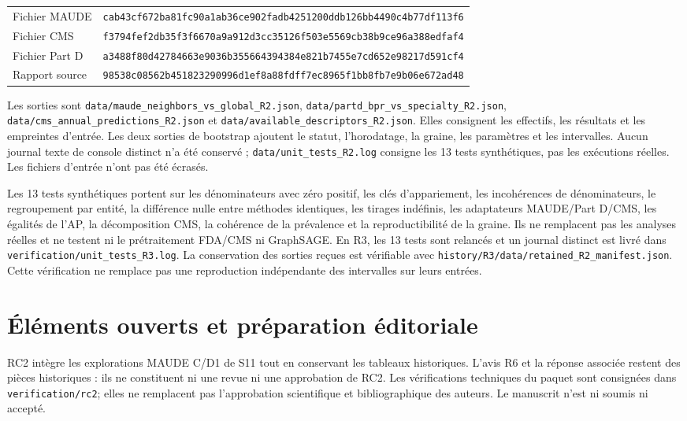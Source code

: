 \documentclass[10pt,a4paper]{article}
\newcommand{\src}[1]{{\small\nolinkurl{#1}}}
\begin{document}
\begin{tabularx}{\linewidth}{@{}lX@{}}
Fichier MAUDE & \src{cab43cf672ba81fc90a1ab36ce902fadb4251200ddb126bb4490c4b77df113f6}\\
Fichier CMS & \src{f3794fef2db35f3f6670a9a912d3cc35126f503e5569cb38b9ce96a388edfaf4}\\
Fichier Part D & \src{a3488f80d42784663e9036b355664394384e821b7455e7cd652e98217d591cf4}\\
Rapport source & \src{98538c08562b451823290996d1ef8a88fdff7ec8965f1bb8fb7e9b06e672ad48}\\
\end{tabularx}

Les sorties sont \src{data/maude_neighbors_vs_global_R2.json}, \src{data/partd_bpr_vs_specialty_R2.json}, \src{data/cms_annual_predictions_R2.json} et \src{data/available_descriptors_R2.json}. Elles consignent les effectifs, les résultats et les empreintes d'entrée. Les deux sorties de bootstrap ajoutent le statut, l'horodatage, la graine, les paramètres et les intervalles. Aucun journal texte de console distinct n'a été conservé ; \src{data/unit_tests_R2.log} consigne les 13 tests synthétiques, pas les exécutions réelles. Les fichiers d'entrée n'ont pas été écrasés.

Les 13 tests synthétiques portent sur les dénominateurs avec zéro positif, les clés d'appariement, les incohérences de dénominateurs, le regroupement par entité, la différence nulle entre méthodes identiques, les tirages indéfinis, les adaptateurs MAUDE/Part D/CMS, les égalités de l'AP, la décomposition CMS, la cohérence de la prévalence et la reproductibilité de la graine. Ils ne remplacent pas les analyses réelles et ne testent ni le prétraitement FDA/CMS ni GraphSAGE.
En R3, les 13 tests sont relancés et un journal distinct est livré dans \src{verification/unit_tests_R3.log}. La conservation des sorties reçues est vérifiable avec \src{history/R3/data/retained_R2_manifest.json}. Cette vérification ne remplace pas une reproduction indépendante des intervalles sur leurs entrées.



\section{Éléments ouverts et préparation éditoriale}
\label{supp:open}
RC2 intègre les explorations MAUDE C/D1 de S11 tout en conservant les tableaux historiques. L'avis R6 et la réponse associée restent des pièces historiques : ils ne constituent ni une revue ni une approbation de RC2. Les vérifications techniques du paquet sont consignées dans \src{verification/rc2}; elles ne remplacent pas l'approbation scientifique et bibliographique des auteurs. Le manuscrit n'est ni soumis ni accepté.
\end{document}
